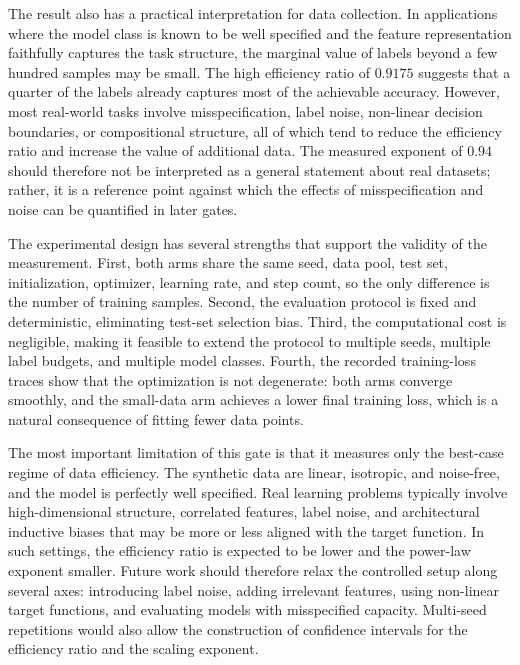 \documentclass[10pt]{article}
\begin{document}
The result also has a practical interpretation for data collection. In applications where the model class is known to be well specified and the feature representation faithfully captures the task structure, the marginal value of labels beyond a few hundred samples may be small. The high efficiency ratio of \(0.9175\) suggests that a quarter of the labels already captures most of the achievable accuracy. However, most real-world tasks involve misspecification, label noise, non-linear decision boundaries, or compositional structure, all of which tend to reduce the efficiency ratio and increase the value of additional data. The measured exponent of \(0.94\) should therefore not be interpreted as a general statement about real datasets; rather, it is a reference point against which the effects of misspecification and noise can be quantified in later gates.

The experimental design has several strengths that support the validity of the measurement. First, both arms share the same seed, data pool, test set, initialization, optimizer, learning rate, and step count, so the only difference is the number of training samples. Second, the evaluation protocol is fixed and deterministic, eliminating test-set selection bias. Third, the computational cost is negligible, making it feasible to extend the protocol to multiple seeds, multiple label budgets, and multiple model classes. Fourth, the recorded training-loss traces show that the optimization is not degenerate: both arms converge smoothly, and the small-data arm achieves a lower final training loss, which is a natural consequence of fitting fewer data points.

The most important limitation of this gate is that it measures only the best-case regime of data efficiency. The synthetic data are linear, isotropic, and noise-free, and the model is perfectly well specified. Real learning problems typically involve high-dimensional structure, correlated features, label noise, and architectural inductive biases that may be more or less aligned with the target function. In such settings, the efficiency ratio is expected to be lower and the power-law exponent smaller. Future work should therefore relax the controlled setup along several axes: introducing label noise, adding irrelevant features, using non-linear target functions, and evaluating models with misspecified capacity. Multi-seed repetitions would also allow the construction of confidence intervals for the efficiency ratio and the scaling exponent.
\end{document}
